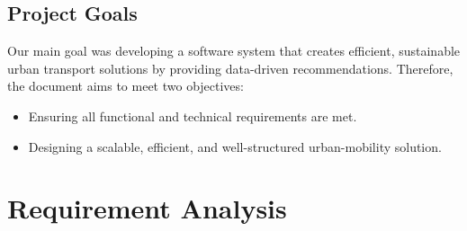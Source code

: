 \documentclass[a4paper,12pt]{article}
\begin{document}
\subsection*{Project Goals}
Our main goal was developing a software system that creates efficient, sustainable urban transport solutions by providing data-driven recommendations. Therefore, the document aims to meet two objectives: 
\begin{itemize}
    \item Ensuring all functional and technical requirements are met.
    \item Designing a scalable, efficient, and well-structured urban-mobility solution.
\end{itemize}

\newpage

\section{Requirement Analysis}
\end{document}
